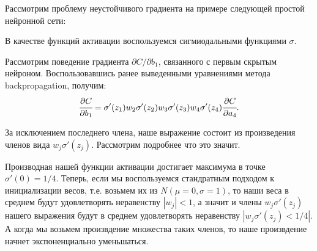 Рассмотрим проблему неустойчивого градиента на примере следующей простой нейронной сети:

\begin{center}

    \label{fig:nn_schematic}
\end{center}
В качестве функций активации воспользуемся сигмиодальными функциями $\sigma$.

Рассмотрим поведение градиента $\partial C/ \partial b_1$, связанного с первым 
скрытым нейроном. Воспользовавшись ранее выведенными уравнениями метода 
backpropagation, получим:
\begin{equation*}
    \cfrac{\partial C}{\partial b_1} = \sigma' (z_1) w_2 \sigma' (z_2) w_3 \sigma'(z_3) w_4 \sigma'(z_4) \cfrac{\partial C}{\partial a_4}.
\end{equation*}

За исключением последнего члена, наше выражение состоит из произведения 
членов вида $w_j \sigma' (z_j)$. Рассмотрим подробнее что это значит.

Производная нашей функции активации достигает максимума в точке $\sigma'(0) = 1/4$. 
Теперь, если мы воспользуемся стандратным подходом к инициализации весов, т.е. 
возьмем их из $N(\mu=0,\sigma=1)$, то наши веса в среднем будут удовлетворять 
неравенству $|w_j| < 1$, а значит и члены $w_j \sigma'(z_j)$ нашего 
выражения будут в среднем удовлетворять неравенству $|w_j \sigma'(z_j) < 1/4|$. 
А когда мы возьмем произвдение множества таких членов, то наше произвдение 
начнет экспоненциально уменьшаться. 

